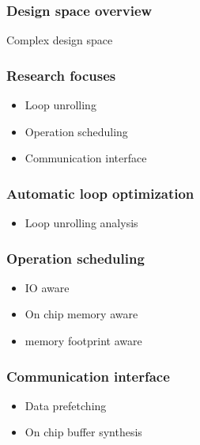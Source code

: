 \documentclass{beamer}
\begin{document}
\begin{frame}
\frametitle{Design space overview}
Complex design space

\end{frame}

\begin{frame}

\frametitle{Research focuses}
\begin{itemize}
\item Loop unrolling
\item Operation scheduling
\item Communication interface
\end{itemize}

\end{frame}

\begin{frame}

\frametitle{Automatic loop optimization}
\begin{itemize}
\item Loop unrolling analysis
\end{itemize}

\end{frame}

\begin{frame}

\frametitle{Operation scheduling}
\begin{itemize}
\item IO aware
\item On chip memory aware
\item memory footprint aware
\end{itemize}

\end{frame}

\begin{frame}

\frametitle{Communication interface}
\begin{itemize}
\item Data prefetching
\item On chip buffer synthesis
\end{itemize}

\end{frame}
\end{document}
